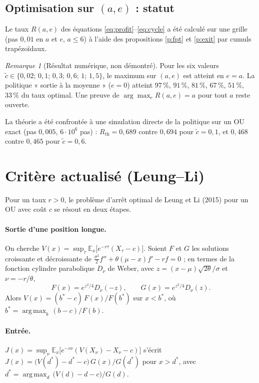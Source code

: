 \documentclass[11pt,a4paper]{article}
\theoremstyle{definition}
\theoremstyle{remark}
\newtheorem{remarque}{Remarque}
\newcommand{\E}{\mathbb{E}}
\DeclareMathOperator*{\argmax}{arg\,max}
\begin{document}
\subsection{Optimisation sur $(a,e)$ : statut}

Le taux $R(a,e)$ des équations \eqref{eq:profit}--\eqref{eq:cycle} a été calculé sur une grille
(pas $0{,}01$ en $a$ et $e$, $a\le6$) à l'aide des propositions \ref{p:fpt} et \ref{p:exit} par cumuls trapézoïdaux.

\begin{remarque}[Résultat numérique, non démontré]
Pour les six valeurs $\tilde c\in\{0{,}02;\,0{,}1;\,0{,}3;\,0{,}6;\,1;\,1{,}5\}$, le maximum sur $(a,e)$ est atteint en $e=a$.
La politique « sortie à la moyenne » ($e=0$) atteint $97\,\%$, $91\,\%$, $81\,\%$, $67\,\%$, $51\,\%$, $33\,\%$ du taux optimal.
Une preuve de $\arg\max_e R(a,e)=a$ pour tout $a$ reste ouverte.
\end{remarque}

La théorie a été confrontée à une simulation directe de la politique sur un OU exact (pas $0{,}005$, $6\cdot10^6$ pas) :
$R_{\mathrm{th}}=0{,}689$ contre $0{,}694$ pour $\tilde c=0{,}1$, et $0{,}468$ contre $0{,}465$ pour $\tilde c=0{,}6$.

\section{Critère actualisé (Leung--Li)}

Pour un taux $r>0$, le problème d'arrêt optimal de Leung et Li (2015) pour un OU avec coût $c$ se résout en deux étapes.

\paragraph{Sortie d'une position longue.} On cherche $V(x)=\sup_{\tau}\E_x\big[e^{-r\tau}(X_\tau-c)\big]$.
Soient $F$ et $G$ les solutions croissante et décroissante de $\tfrac{\sigma^2}{2}f''+\theta(\mu-x)f'-rf=0$ ; en termes de la
fonction cylindre parabolique $D_\nu$ de Weber, avec $z=(x-\mu)\sqrt{2\theta}/\sigma$ et $\nu=-r/\theta$,
\[
F(x)=e^{z^2/4}D_{\nu}(-z),\qquad G(x)=e^{z^2/4}D_{\nu}(z).
\]
Alors $V(x)=(b^*-c)\,F(x)/F(b^*)$ sur $x<b^*$, où $b^*=\argmax_b\,(b-c)/F(b)$.

\paragraph{Entrée.} $J(x)=\sup_{\nu}\E_x\big[e^{-r\nu}(V(X_\nu)-X_\nu-c)\big]$ s'écrit $J(x)=\big(V(d^*)-d^*-c\big)\,G(x)/G(d^*)$ pour $x>d^*$, avec
$d^*=\argmax_d\,\big(V(d)-d-c\big)/G(d)$.
\end{document}
